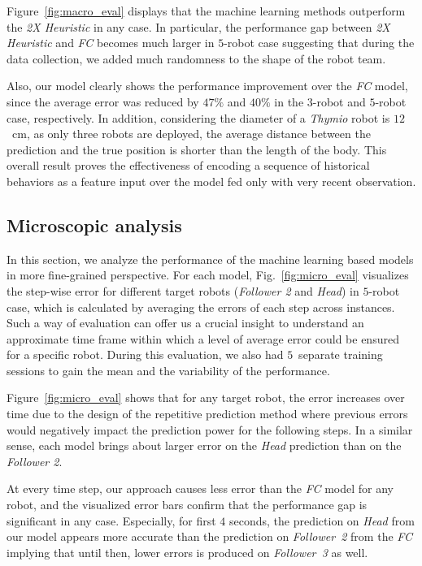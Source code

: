\documentclass[letterpaper, 10 pt, conference]{ieeeconf}  %
\begin{document}
	Figure~\ref{fig:macro_eval} displays that the machine learning methods outperform 
	the \emph{2X Heuristic} in any case. In particular, the performance gap between 
	\emph{2X Heuristic} and \emph{FC} becomes much larger in $5$-robot case suggesting that
	during the data collection, we added much randomness to the shape of the robot team.  
	
	Also, our model clearly shows the performance improvement over the \emph{FC} model, since 
	the average error was reduced by $47\%$ and $40\%$ in the $3$-robot and $5$-robot case, 
	respectively. In addition, considering the diameter of a \emph{Thymio} robot is 
	$12$~cm, as only three robots are deployed, the average distance between the prediction 
	and the true position is shorter than the length of the body. This overall result proves 
	the effectiveness of encoding a sequence of historical behaviors as a feature input
	over the model fed only with very recent observation.  

	
	\subsection{Microscopic analysis}
	\label{sec:microscopic_analysis}
	
	In this section, we analyze the performance of the machine learning based models 
	in more fine-grained perspective. For each model, Fig.~\ref{fig:micro_eval} visualizes the 
	step-wise error for different target robots (\emph{Follower 2} and \emph{Head}) 
	in $5$-robot case, which is calculated by averaging the errors of each step across instances. 
	Such a way of evaluation can offer us a crucial insight to understand an approximate time frame 
	within which a level of average error could be ensured for a specific robot. During this 
	evaluation, we also had $5$~separate training sessions to gain the mean and the variability 
	of the performance. 
	
	Figure~\ref{fig:micro_eval} shows that for any target robot, the error increases over time due to the 
	design of the repetitive prediction method where previous errors would negatively 
	impact the prediction power for the following steps. In a similar sense, each model 
	brings about larger error on the \emph{Head} prediction than on the \emph{Follower 2}. 
	
	At every time step, our approach causes less error than the \emph{FC} model for any robot, and  
    the visualized error bars confirm that the performance gap is significant in any case.  
    Especially, for first $4$ seconds, the prediction on \emph{Head} from our model appears 
    more accurate than the prediction on \emph{Follower~2} from the \emph{FC} implying that 
    until then, lower errors is produced on \emph{Follower~3} as well. 
    
\end{document}
